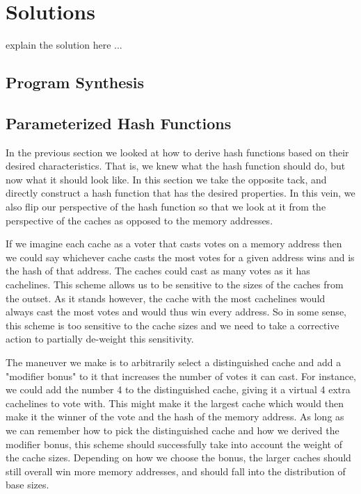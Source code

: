 \section{Solutions}
\label{sec:Solution}

explain the solution here ...

\subsection{Program Synthesis}

\subsection{Parameterized Hash Functions}

In the previous section we looked at how to derive hash functions based on their
desired characteristics. That is, we knew what the hash function should do, but
now what it should look like. In this section we take the opposite tack, and
directly construct a hash function that has the desired properties. In this
vein, we also flip our perspective of the hash function so that we look at it
from the perspective of the caches as opposed to the memory addresses.

If we imagine each cache as a voter that casts votes on a memory address then we
could say whichever cache casts the most votes for a given address wins and is
the hash of that address. The caches could cast as many votes as it has
cachelines. This scheme allows us to be sensitive to the sizes of the caches
from the outset. As it stands however, the cache with the most cachelines would
always cast the most votes and would thus win every address.  So in some sense,
this scheme is too sensitive to the cache sizes and we need to take a corrective
action to partially de-weight this sensitivity.

The maneuver we make is to arbitrarily select a distinguished cache and add a
"modifier bonus" to it that increases the number of votes it can cast. For
instance, we could add the number 4 to the distinguished cache, giving it a
virtual 4 extra cachelines to vote with. This might make it the largest cache
which would then make it the winner of the vote and the hash of the memory
address. As long as we can remember how to pick the distinguished cache and how
we derived the modifier bonus, this scheme should successfully take into account
the weight of the cache sizes. Depending on how we choose the bonus, the larger
caches should still overall win more memory addresses, and should fall into the
distribution of base sizes.

